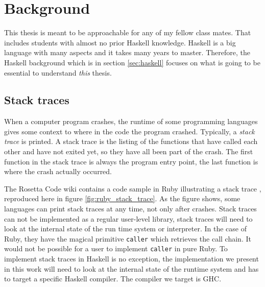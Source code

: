 \chapter{Background}

This thesis is meant to be approachable for any of my fellow class
mates. That includes students with almost no prior Haskell knowledge.
Haskell is a big language with many aspects and it takes many years
to master. Therefore, the Haskell background which is in section
\ref{sec:haskell} focuses on what is going to be essential to understand
\emph{this} thesis.

\section{Stack traces}

When a computer program crashes, the runtime of some programming languages
gives some context to where in the code the program crashed.
Typically, a \emph{stack trace} is printed. A stack trace is the listing
of the functions that have called each other and have not exited yet, so
they have all been part of the crash. The first function in the stack
trace is always the program entry point, the last function is where the
crash actually occurred.

The Rosetta Code wiki contains a code sample in Ruby illustrating a stack
trace \cite{rosetta_stone_st}, reproduced here in figure
\ref{fig:ruby_stack_trace}. As the figure shows, some languages can print stack
traces at any time, not only after crashes. Stack traces can not be
implemented as a regular user-level library, stack traces will need
to look at the internal state of the run time system or interpreter.
In the case of Ruby, they have the magical primitive \texttt{caller} which
retrieves the call chain. It would not be possible for a user
to implement \texttt{caller} in pure Ruby. To implement stack traces
in Haskell is no exception, the implementation we present in this work
will need to look at the internal state of the runtime system and has to
target a specific Haskell compiler. The compiler we target is GHC.


